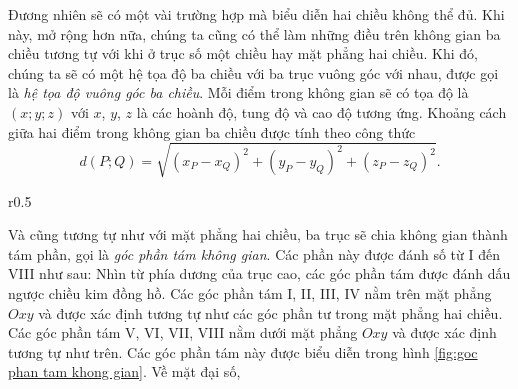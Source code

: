 \documentclass[a4paper, titlepage, openany]{book}
\begin{document}
Đương nhiên sẽ có một vài trường hợp mà biểu diễn hai chiều không thể đủ. Khi này, mở rộng hơn nữa, chúng ta cũng có thể làm những điều trên không gian ba chiều tương tự với khi ở trục số một chiều hay mặt phẳng hai chiều. Khi đó, chúng ta sẽ có một hệ tọa độ ba chiều với ba trục vuông góc với nhau, được gọi là \emph{hệ tọa độ vuông góc ba chiều}. Mỗi điểm trong không gian sẽ có tọa độ là $(x;y;z)$ với $x$, $y$, $z$ là các hoành độ, tung độ và cao độ tương ứng. Khoảng cách giữa hai điểm trong không gian ba chiều được tính theo công thức $$d(P;Q)=\sqrt{(x_P-x_Q)^2+(y_P-y_Q)^2+(z_P-z_Q)^2}.$$

\begin{wrapfigure}{r}{0.5\textwidth}
   \centering
   \caption{Góc phần tám không gian}
   \label{fig:goc phan tam khong gian}
\end{wrapfigure}

Và cũng tương tự như với mặt phẳng hai chiều, ba trục sẽ chia không gian thành tám phần, gọi là \emph{góc phần tám không gian}. Các phần này được đánh số từ I đến VIII như sau: Nhìn từ phía dương của trục cao, các góc phần tám được đánh dấu ngược chiều kim đồng hồ. Các góc phần tám I, II, III, IV nằm trên mặt phẳng $Oxy$ và được xác định tương tự như các góc phần tư trong mặt phẳng hai chiều. Các góc phần tám V, VI, VII, VIII nằm dưới mặt phẳng $Oxy$ và được xác định tương tự như trên. Các góc phần tám này được biểu diễn trong hình \ref{fig:goc phan tam khong gian}. Về mặt đại số, 
\end{document}
